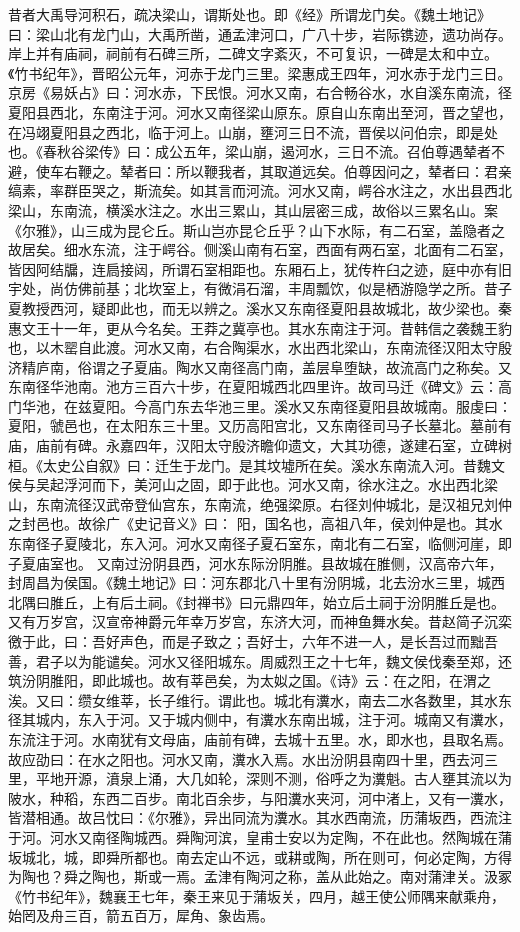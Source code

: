 \documentclass[12pt,UTF8]{ctexbook}
\begin{document}
昔者大禹导河积石，疏决梁山，谓斯处也。即《经》所谓龙门矣。《魏土地记》曰：梁山北有龙门山，大禹所凿，通孟津河口，广八十步，岩际镌迹，遗功尚存。岸上并有庙祠，祠前有石碑三所，二碑文字紊灭，不可复识，一碑是太和中立。《竹书纪年》，晋昭公元年，河赤于龙门三里。梁惠成王四年，河水赤于龙门三日。京房《易妖占》曰：河水赤，下民恨。河水又南，右合畅谷水，水自溪东南流，径夏阳县西北，东南注于河。河水又南径梁山原东。原自山东南出至河，晋之望也，在冯翊夏阳县之西北，临于河上。山崩，壅河三日不流，晋侯以问伯宗，即是处也。《春秋谷梁传》曰：成公五年，梁山崩，遏河水，三日不流。召伯尊遇辇者不避，使车右鞭之。辇者曰：所以鞭我者，其取道远矣。伯尊因问之，辇者曰：君亲缟素，率群臣哭之，斯流矣。如其言而河流。河水又南，崿谷水注之，水出县西北梁山，东南流，横溪水注之。水出三累山，其山层密三成，故俗以三累名山。案《尔雅》，山三成为昆仑丘。斯山岂亦昆仑丘乎？山下水际，有二石室，盖隐者之故居矣。细水东流，注于崿谷。侧溪山南有石室，西面有两石室，北面有二石室，皆因阿结牖，连扃接闼，所谓石室相距也。东厢石上，犹传杵臼之迹，庭中亦有旧宇处，尚仿佛前基；北坎室上，有微涓石溜，丰周瓢饮，似是栖游隐学之所。昔子夏教授西河，疑即此也，而无以辨之。溪水又东南径夏阳县故城北，故少梁也。秦惠文王十一年，更从今名矣。王莽之冀亭也。其水东南注于河。昔韩信之袭魏王豹也，以木罂自此渡。河水又南，右合陶渠水，水出西北梁山，东南流径汉阳太守殷济精庐南，俗谓之子夏庙。陶水又南径高门南，盖层阜堕缺，故流高门之称矣。又东南径华池南。池方三百六十步，在夏阳城西北四里许。故司马迁《碑文》云：高门华池，在兹夏阳。今高门东去华池三里。溪水又东南径夏阳县故城南。服虔曰：夏阳，虢邑也，在太阳东三十里。又历高阳宫北，又东南径司马子长墓北。墓前有庙，庙前有碑。永嘉四年，汉阳太守殷济瞻仰遗文，大其功德，遂建石室，立碑树桓。《太史公自叙》曰：迁生于龙门。是其坟墟所在矣。溪水东南流入河。昔魏文侯与吴起浮河而下，美河山之固，即于此也。河水又南，徐水注之。水出西北梁山，东南流径汉武帝登仙宫东，东南流，绝强梁原。右径刘仲城北，是汉祖兄刘仲之封邑也。故徐广《史记音义》曰： 阳，国名也，高祖八年，侯刘仲是也。其水东南径子夏陵北，东入河。河水又南径子夏石室东，南北有二石室，临侧河崖，即子夏庙室也。
又南过汾阴县西，河水东际汾阴脽。县故城在脽侧，汉高帝六年，封周昌为侯国。《魏土地记》曰：河东郡北八十里有汾阴城，北去汾水三里，城西北隅曰脽丘，上有后土祠。《封禅书》曰元鼎四年，始立后土祠于汾阴脽丘是也。又有万岁宫，汉宣帝神爵元年幸万岁宫，东济大河，而神鱼舞水矣。昔赵简子沉栾徼于此，曰：吾好声色，而是子致之；吾好士，六年不进一人，是长吾过而黜吾善，君子以为能谴矣。河水又径阳城东。周威烈王之十七年，魏文侯伐秦至郑，还筑汾阴脽阳，即此城也。故有莘邑矣，为太姒之国。《诗》云：在之阳，在渭之涘。又曰：缵女维莘，长子维行。谓此也。城北有瀵水，南去二水各数里，其水东径其城内，东入于河。又于城内侧中，有瀵水东南出城，注于河。城南又有瀵水，东流注于河。水南犹有文母庙，庙前有碑，去城十五里。水，即水也，县取名焉。故应劭曰：在水之阳也。河水又南，瀵水入焉。水出汾阴县南四十里，西去河三里，平地开源，濆泉上涌，大几如轮，深则不测，俗呼之为瀵魁。古人壅其流以为陂水，种稻，东西二百步。南北百余步，与阳瀵水夹河，河中渚上，又有一瀵水，皆潜相通。故吕忱曰：《尔雅》，异出同流为瀵水。其水西南流，历蒲坂西，西流注于河。河水又南径陶城西。舜陶河滨，皇甫士安以为定陶，不在此也。然陶城在蒲坂城北，城，即舜所都也。南去定山不远，或耕或陶，所在则可，何必定陶，方得为陶也？舜之陶也，斯或一焉。孟津有陶河之称，盖从此始之。南对蒲津关。汲冢《竹书纪年》，魏襄王七年，秦王来见于蒲坂关，四月，越王使公师隅来献乘舟，始罔及舟三百，箭五百万，犀角、象齿焉。
\end{document}
